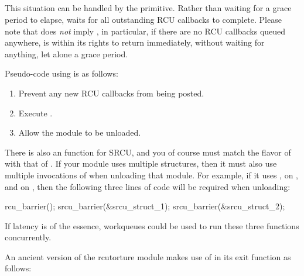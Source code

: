 \subsection{}
\label{sec:rcu:rcu_barrier()}

This situation can be handled by the  primitive.
Rather
than waiting for a grace period to elapse,  waits for all
outstanding RCU callbacks to complete.
Please note that 
does \emph{not} imply , in particular, if there are no RCU
callbacks queued anywhere,  is within its rights to return
immediately, without waiting for anything, let alone a grace period.

Pseudo-code using  is as follows:

\begin{enumerate}
\item Prevent any new RCU callbacks from being posted.
\item Execute .
\item Allow the module to be unloaded.
\end{enumerate}

There is also an  function for SRCU, and you of course
must match the flavor of  with that of .
If your module uses multiple  structures, then it must also
use multiple invocations of  when unloading that module.
For example, if it uses ,  on , and
 on , then the following three lines of code
will be required when unloading:

\begin{VerbatimN}
  rcu_barrier();
  srcu_barrier(&srcu_struct_1);
  srcu_barrier(&srcu_struct_2);
\end{VerbatimN}

If latency is of the essence, workqueues could be used to run these
three functions concurrently.

An ancient version of the rcutorture module makes use of 
in its exit function as follows:

